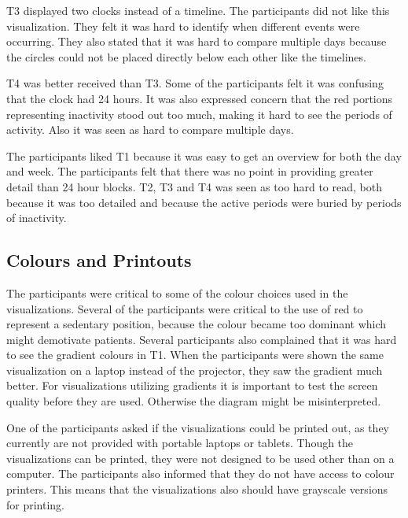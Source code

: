 T3 displayed two clocks instead of a timeline. The participants did not like this visualization. They felt it was hard to identify when different events were occurring. They also stated that it was hard to compare multiple days because the circles could not be placed directly below each other like the timelines.

T4 was better received than T3. Some of the participants felt it was confusing that the clock had 24 hours. It was also expressed concern that the red portions representing inactivity stood out too much, making it hard to see the periods of activity. Also it was seen as hard to compare multiple days.

The participants liked T1 because it was easy to get an overview for both the day and week. The participants felt that there was no point in providing greater detail than 24 hour blocks. T2, T3 and T4 was seen as too hard to read, both because it was too detailed and because the active periods were buried by periods of inactivity.

\subsection{Colours and Printouts}
The participants were critical to some of the colour choices used in the visualizations. Several of the participants were critical to the use of red to represent a sedentary position, because the colour became too dominant which might demotivate patients. Several participants also complained that it was hard to see the gradient colours in T1. When the participants were shown the same visualization on a laptop instead of the projector, they saw the gradient much better. For visualizations utilizing gradients it is important to test the screen quality before they are used. Otherwise the diagram might be misinterpreted. 

One of the participants asked if the visualizations could be printed out, as they currently are not provided with portable laptops or tablets. Though the visualizations can be printed, they were not designed to be used other than on a computer. The participants also informed that they do not have access to colour printers. This means that the visualizations also should have grayscale versions for printing. 
